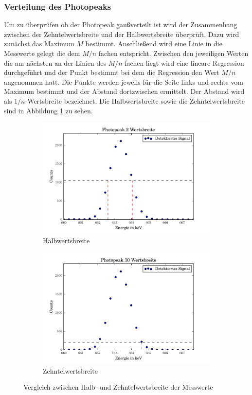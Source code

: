 \subsubsection{Verteilung des Photopeaks}
Um zu überprüfen ob der Photopeak gaußverteilt ist wird der Zusammenhang zwischen der Zehntelwertsbreite und der Halbwertsbreite überprüft. Dazu wird zunächst das Maximum $M$ bestimmt. Anschließend wird eine Linie in die Messwerte gelegt die dem $M/n$ fachen entspricht. Zwischen den jeweiligen Werten die am nächsten an der Linien des $M/n$ fachen liegt wird eine lineare Regression durchgeführt und der Punkt bestimmt bei dem die Regression den Wert $M/n$ angenommen hatt. Die Punkte werden jeweils für die Seite links und rechts vom Maximum bestimmt und der Abstand dortzwischen ermittelt. Der Abstand wird als $1/n$-Wertsbreite bezeichnet.
Die Halbwertsbreite sowie die Zehntelwertsbreite sind in Abbildung \ref{fig:Halb} zu sehen.

\begin{figure}[htpb]
	\centering
	\begin{subfigure}[t]{0.5\textwidth}
		\centering
		\includegraphics[width=\textwidth]{./build/2Wertsbreite.pdf}
		\caption{Halbwertsbreite}
	\end{subfigure}%
	\begin{subfigure}[t]{0.5\textwidth}
		\centering
		\includegraphics[width=\textwidth]{./build/10Wertsbreite.pdf}
		\caption{Zehntelwertsbreite}
	\end{subfigure}
	\caption{Vergleich zwischen Halb- und Zehntelwertsbreite der Messwerte}
	\label{fig:Halb}
\end{figure}

